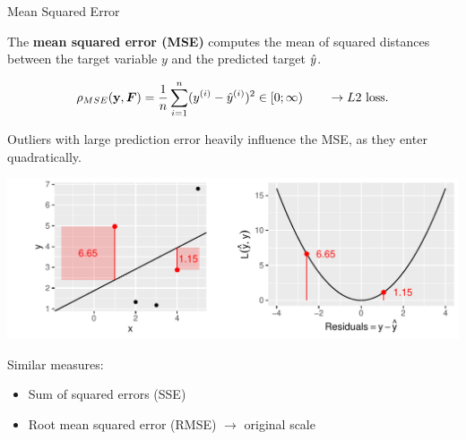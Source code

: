 \begin{vbframe}{Mean Squared Error}

The \textbf{mean squared error (MSE)} computes the mean of squared distances 
between the target variable $y$ and the predicted target $\hat{y}$.

$$
\rho_{MSE}(\mathbf{y}, \boldsymbol{F}) = \frac{1}{n} \sum\limits_{i=1}^n (y^{(i)} - \hat{y}^{(i)})^2 \in [0;\infty) \qquad \rightarrow L2 \text{ loss}.
$$

\begin{minipage}[c]{0.33\textwidth}
  \raggedright
  \small
  Outliers with large prediction error heavily influence the MSE, as they 
  enter quadratically.
\end{minipage}%
\begin{minipage}[c]{0.67\textwidth}
  \begin{knitrout}\scriptsize
  \color{fgcolor}
  {\includegraphics[width=\textwidth]{figure/plot_quad_loss}}
\end{knitrout}
\end{minipage}


\small

\small
Similar measures:

\begin{itemize}
  \small
  \item Sum of squared errors (SSE)
  \item Root mean squared error (RMSE) $\rightarrow$ original scale
\end{itemize}

\end{vbframe}


